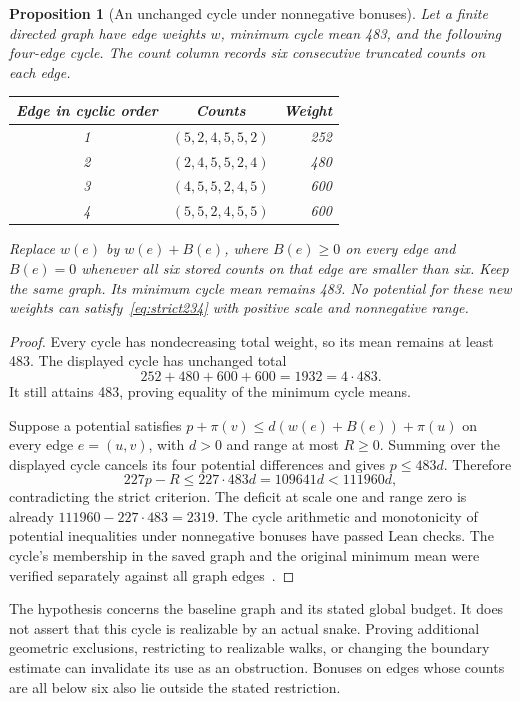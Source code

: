 \documentclass[11pt,a4paper]{article}
\newtheorem{proposition}[theorem]{Proposition}
\theoremstyle{definition}
\theoremstyle{remark}
\begin{document}
\begin{proposition}[An unchanged cycle under nonnegative bonuses]\label{prop:unsaturated-cycle}
Let a finite directed graph have edge weights $w$, minimum cycle mean 483,
and the following four-edge cycle. The count column records six consecutive
truncated counts on each edge.
\begin{center}
\begin{tabular}{c c r}
\toprule
Edge in cyclic order & Counts & Weight\\\midrule
1 & $(5,2,4,5,5,2)$ & 252\\
2 & $(2,4,5,5,2,4)$ & 480\\
3 & $(4,5,5,2,4,5)$ & 600\\
4 & $(5,5,2,4,5,5)$ & 600\\
\bottomrule
\end{tabular}
\end{center}
Replace $w(e)$ by $w(e)+B(e)$, where $B(e)\ge0$ on every edge and $B(e)=0$
whenever all six stored counts on that edge are smaller than six. Keep the
same graph. Its minimum cycle mean remains 483. No potential for these new
weights can satisfy~\eqref{eq:strict234} with positive scale and nonnegative
range.
\end{proposition}
\begin{proof}
Every cycle has nondecreasing total weight, so its mean remains at least 483.
The displayed cycle has unchanged total
\[
252+480+600+600=1932=4\cdot483.
\]
It still attains 483, proving equality of the minimum cycle means.

Suppose a potential satisfies $p+\pi(v)\le d(w(e)+B(e))+\pi(u)$ on every
edge $e=(u,v)$, with $d>0$ and range at most $R\ge0$. Summing over the displayed
cycle cancels its four potential differences and gives $p\le483d$. Therefore
\[
227p-R\le227\cdot483d=109641d<111960d,
\]
contradicting the strict criterion. The deficit at scale one and range zero
is already $111960-227\cdot483=2319$. The cycle arithmetic and monotonicity
of potential inequalities under nonnegative bonuses have passed Lean checks.
The cycle's membership in the saved graph and the original minimum mean were
verified separately against all graph edges~\cite{unsaturatedarchive}.
\end{proof}

The hypothesis concerns the baseline graph and its stated global budget.
It does not assert that this cycle is realizable by an actual snake. Proving
additional geometric exclusions, restricting to realizable walks, or changing
the boundary estimate can invalidate its use as an obstruction. Bonuses on
edges whose counts are all below six also lie outside the stated restriction.
\end{document}
